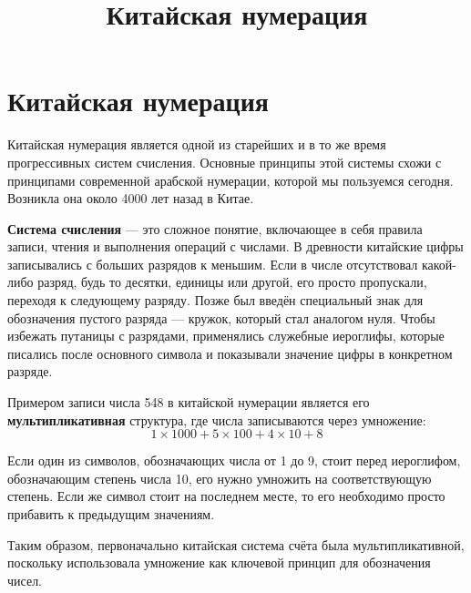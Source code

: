 \documentclass[12pt]{article} %
\title{Китайская нумерация}
\author{}
\date{}
\begin{document}
\maketitle

\section*{Китайская нумерация}

Китайская нумерация является одной из старейших и в то же время прогрессивных систем счисления. Основные принципы этой системы схожи с принципами современной арабской нумерации, которой мы пользуемся сегодня. Возникла она около 4000 лет назад в Китае.

\textbf{Система счисления} — это сложное понятие, включающее в себя правила записи, чтения и выполнения операций с числами. В древности китайские цифры записывались с больших разрядов к меньшим. Если в числе отсутствовал какой-либо разряд, будь то десятки, единицы или другой, его просто пропускали, переходя к следующему разряду. Позже был введён специальный знак для обозначения пустого разряда — кружок, который стал аналогом нуля. Чтобы избежать путаницы с разрядами, применялись служебные иероглифы, которые писались после основного символа и показывали значение цифры в конкретном разряде.

Примером записи числа 548 в китайской нумерации является его \textbf{мультипликативная} структура, где числа записываются через умножение: 
\[
1 \times 1 000 + 5 \times 100 + 4 \times 10 + 8
\]

Если один из символов, обозначающих числа от 1 до 9, стоит перед иероглифом, обозначающим степень числа 10, его нужно умножить на соответствующую степень. Если же символ стоит на последнем месте, то его необходимо просто прибавить к предыдущим значениям.

Таким образом, первоначально китайская система счёта была мультипликативной, поскольку использовала умножение как ключевой принцип для обозначения чисел.
\end{document}
